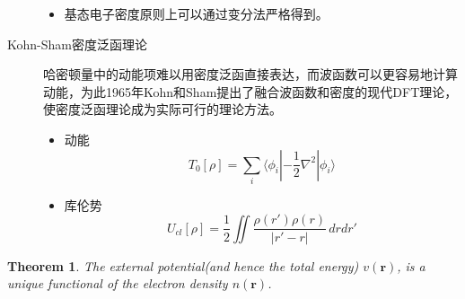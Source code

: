 \documentclass[12pt,a4paper,openany,twoside]{book}
\newtheorem{theorem}{Theorem}[section]
\numberwithin{equation}{section}
\newcommand{\bracketl}[3]{\langle #1 | #2 | #3 \rangle}
\newcommand{\grad}{\nabla}
\begin{document}
\begin{description}
\begin{itemize}
      \item 基态电子密度原则上可以通过变分法严格得到。
  
    \end{itemize}
  
    \item[Kohn-Sham密度泛函理论]
    哈密顿量中的动能项难以用密度泛函直接表达，而波函数可以更容易地计算动能，为此1965年Kohn和Sham提出了融合波函数和密度的现代DFT理论，使密度泛函理论成为实际可行的理论方法。
  
    \begin{itemize}
      \item 动能
      \begin{equation}
      T_0[\rho]=\sum_i\bracketl{\phi_i}{-\frac{1}{2}\grad^2}{\phi_i}
      \end{equation}
  
      \item 库伦势
      \begin{equation}
      U_{cl}[\rho]=\frac{1}{2}\iint\frac{\rho(r')\rho(r)}{|r'-r|}\,drdr'
      \end{equation}
    \end{itemize}
  
  \end{description}
  
  
  \begin{theorem}
  The external potential(and hence the total energy) $v(\textbf{r})$, is a unique functional of the electron density $n(\textbf{r})$.
  \end{theorem}
  
\end{document}
